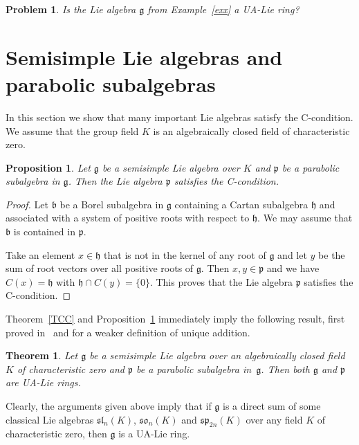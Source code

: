 \documentclass[a4paper,draft,reqno,12pt]{amsart}
\newtheorem{proposition}{Proposition}
\newtheorem{problem}{Problem}
\newtheorem{theorem}{Theorem}
\theoremstyle{definition}
\theoremstyle{remark}
\def\ggg{\mathfrak{g}}
\def\hhh{\mathfrak{h}}
\def\ppp{\mathfrak{p}}
\def\bbb{\mathfrak{b}}
\def\sl{\mathfrak{sl}}
\def\so{\mathfrak{so}}
\def\sp{\mathfrak{sp}}
\begin{document}
\begin{problem}
Is the Lie algebra $\ggg$ from Example~\ref{exx} a UA-Lie ring?
\end{problem} 

\section{Semisimple Lie algebras and parabolic subalgebras}
\label{sla}

In this section we show that many important Lie algebras satisfy the C-condition. We assume that the group field $K$ is an algebraically closed field of characteristic zero. 

\begin{proposition} 
\label{PCC}
Let $\ggg$ be a semisimple Lie algebra over $K$ and $\ppp$ be a parabolic subalgebra in $\ggg$. Then the Lie algebra $\ppp$ satisfies the C-condition. 
\end{proposition} 

\begin{proof} 
Let $\bbb$ be a Borel subalgebra in $\ggg$ containing a Cartan subalgebra $\hhh$ and associated with a system of positive roots with respect to $\hhh$. We may assume that $\bbb$ is contained in $\ppp$.

Take an element $x\in\hhh$ that is not in the kernel of any root of $\ggg$ and let $y$ be the sum of root vectors over all positive roots of $\ggg$. Then $x,y\in\ppp$ and we have 
$C(x) = \hhh$ with $\hhh\cap C(y)=\{0\}$. This proves that the Lie algebra $\ppp$ satisfies the C-condition.
\end{proof}

Theorem~\ref{TCC} and Proposition~\ref{PCC} immediately imply the following result, first proved in~\cite[Theorem~1]{A3} and \cite[Corollary~4.6]{A4} for a weaker definition of unique addition. 

\begin{theorem}
\label{tmain}
Let $\ggg$ be a semisimple Lie algebra over an algebraically closed field $K$ of characteristic zero and $\ppp$ be a parabolic subalgebra in~$\ggg$. Then both $\ggg$ and $\ppp$ are UA-Lie rings. 
\end{theorem} 

Clearly, the arguments given above imply that if $\ggg$ is a direct sum of some classical Lie algebras $\sl_n(K)$, $\so_n(K)$ and $\sp_{2n}(K)$ over any field $K$ of characteristic zero, then 
$\ggg$ is a UA-Lie ring.  
\end{document}
